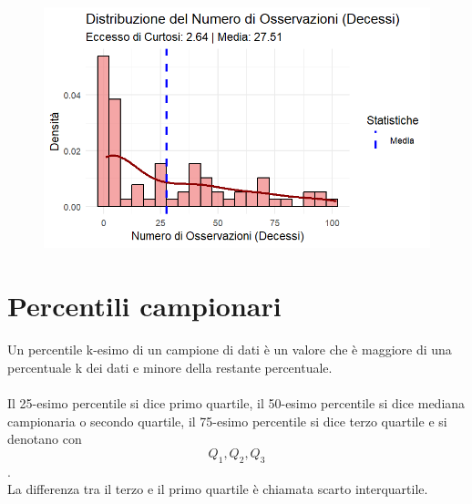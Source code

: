 \documentclass[14pt, openany, titlepage]{report} %
\begin{document}
\begin{figure}[H] 
    \centering
    \includegraphics[width=12cm, height=7cm]{Rplot07.png} 
\end{figure}

\chapter{Percentili campionari}
Un percentile k-esimo di un campione di dati è un valore che 
è maggiore di una percentuale k dei dati e minore della 
restante percentuale. \\\\
\noindent
Il 25-esimo percentile si dice primo quartile, il 50-esimo percentile
si dice mediana campionaria o secondo quartile, il 75-esimo percentile
si dice terzo quartile e si denotano con \[Q_{1}, Q_{2}, Q_{3} \].\\
La differenza tra il terzo e il primo quartile è chiamata scarto interquartile.
\end{document}
